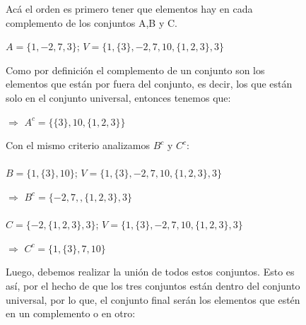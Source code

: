 \documentclass[10pt]{article}
\begin{document}
\begin{ej}
\begin{itemize}
\begin{figure}[H]
\begin{minipage}[b]{0.5\linewidth}
Acá el orden es primero tener que elementos hay en cada complemento de los conjuntos A,B y C.

$A = \{ 1,-2,7,3  \}$; $V=\{ 1, \{3\}, -2,7,10,\{1,2,3\},3 \} $

Como por definición el complemento de un conjunto son los elementos que están por fuera del conjunto, es decir, los que están solo en el conjunto universal, entonces tenemos que:

$\Rightarrow$ \textcolor{B}{$A^c = \{    \{3\},10,\{1,2,3\}     \}$}



Con el mismo criterio analizamos $B^c$ y $C^c$: 
\\\\
$B = \{  1,\{3\},10  \}$; $V = \{  1, \{3\}, -2,7,10,\{1,2,3\},3  \} $

$\Rightarrow$ \textcolor{B}{$B^c = \{     -2,7,,\{1,2,3\},3     \}$}
\\\\
$C = \{ -2,\{1,2,3\},3  \}$; $V=\{ 1, \{3\}, -2,7,10,\{1,2,3\},3 \} $

$\Rightarrow$ \textcolor{B}{$C^c = \{    1, \{3\},7,10    \}$}

Luego, debemos realizar la unión de todos estos conjuntos. Esto es así, por el hecho de que los tres conjuntos están dentro del conjunto universal, por lo que, el conjunto final serán los elementos que estén en un complemento o en otro:



\end{minipage}
\end{figure}
\end{itemize}
\end{ej}
\end{document}
